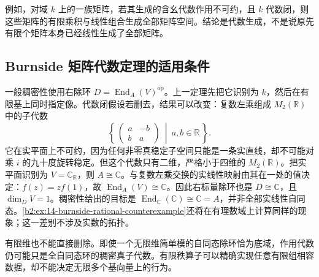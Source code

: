 \ProseParagraphBreak
例如，对域 \(k\) 上的一族矩阵，若其生成的含幺代数作用不可约，且 \(k\) 代数闭，则这些矩阵的有限乘积与线性组合生成全部矩阵空间。结论是代数生成，不是说原先有限个矩阵本身已经线性生成了全部矩阵。

\subsection{Burnside 矩阵代数定理的适用条件}
\label{b2:subsec:1405:02}

一般稠密性使用右除环 \(D=\operatorname{End}_A(V)^{\mathrm{op}}\)。上一定理先把它识别为 \(k\)，然后在有限基上同时指定像。代数闭假设若删去，结果可以改变：复数左乘组成 \(M_2(\mathbb R)\) 中的子代数
\[
	\left\{
	\,\begin{pmatrix}a&-b\\b&a\end{pmatrix}
	\ \middle|\ a,b\in\mathbb R\, \right\}.
\]
它在实平面上不可约，因为任何非零真稳定子空间只能是一条实直线，却不可能对乘 \(i\) 的九十度旋转稳定。但这个代数只有二维，严格小于四维的 \(M_2(\mathbb R)\)。把实平面识别为 \(V=\mathbb C_{\mathbb R}\)，则 \(A\cong\mathbb C\)。与复数左乘交换的实线性映射由其在一处的值决定：\(f(z)=zf(1)\)，故 \(\operatorname{End}_A(V)\cong\mathbb C\)。因此右标量除环也是 \(D\cong\mathbb C\)，且 \(\dim_DV=1\)。稠密性给出的目标是 \(\operatorname{End}_{\mathbb C}(\mathbb C)\cong\mathbb C=A\)，并非全部实线性自同态。\cref{b2:ex:14-burnside-rational-counterexample}还将在有理数域上计算同样的现象；这一差别不涉及实数的拓扑。

\ProseParagraphBreak
有限维也不能直接删除。即使一个无限维简单模的自同态除环恰为底域，作用代数仍可能只是全自同态环的稠密真子代数。有限秩算子可以精确实现任意有限组相容数据，却不能决定无限多个基向量上的行为。

